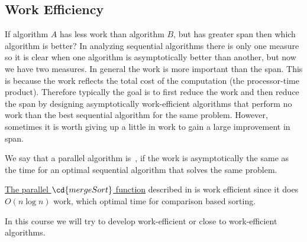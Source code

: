 \subsection{Work Efficiency}

\begin{gram}
If algorithm $A$ has less work than algorithm $B$, but has greater
span then which algorithm is better?  In analyzing sequential
algorithms there is only one measure so it is clear when one algorithm
is asymptotically better than another, but now we have two measures.
In general the work is more important than the span.  
%
This is because the work reflects the total cost of the computation
(the processor-time product).  Therefore typically the goal is to
first reduce the work and then reduce the span by designing
asymptotically work-efficient algorithms that perform no work
than the best sequential algorithm for the same problem. 
%
However, sometimes it is worth giving up a little in work to gain a
large improvement in span.
%
\end{gram}

\begin{flex}
\begin{definition}
\label{def:intro::intro::work-efficiency}
We say that a parallel algorithm is~, if the work is asymptotically the same as the time for
an optimal sequential algorithm that solves the same problem.
\end{definition} 

\begin{example}
\href{ex:intro::intro::mergesort-cost}{The parallel $\cd{mergeSort}$ function} described in is work efficient since it does $O(n \log n)$ work, which optimal time for comparison based sorting. 

In this course we will try to develop work-efficient or close to work-efficient algorithms.
\end{example}


\end{flex}



